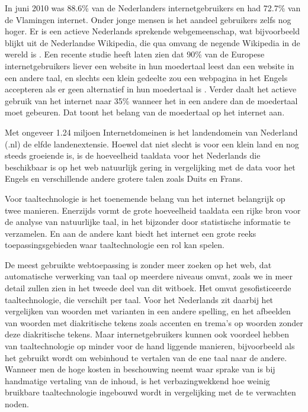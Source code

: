 \documentclass[]{../../metanetpaper}
\begin{document}
\begin{multicols}{2}
    In juni 2010 was 88.6\% van de Nederlanders  internetgebruikers \cite{Internetworldstats} en had 72.7\% van de Vlamingen \cite{VRIND} internet. Onder jonge mensen is het aandeel gebruikers zelfs nog hoger. Er is een actieve Nederlands sprekende webgemeenschap, wat bijvoorbeeld blijkt uit de Nederlandse Wikipedia, die qua omvang de negende Wikipedia in de wereld is \cite{Wikipedia}.  Een recente studie heeft laten zien dat 90\% van de Europese internetgebruikers liever een website in hun moedertaal leest dan een website in een andere taal, en slechts een klein gedeelte zou een webpagina in het Engels accepteren als er geen alternatief in hun moedertaal is \cite{Flash}. Verder daalt het actieve gebruik van het internet naar 35\% wanneer het in een andere dan de moedertaal moet gebeuren. Dat toont het belang van de moedertaal op het internet aan.


    Met ongeveer 1.24 miljoen Internetdomeinen \cite{Webstats} is het landendomein van Nederland (.nl) de elfde landenextensie. Hoewel dat niet slecht is voor een klein land en nog steeds groeiende is, is de hoeveelheid taaldata voor het Nederlands die beschikbaar is op het web natuurlijk gering in vergelijking met de data voor het Engels en verschillende andere grotere talen zoals Duits en Frans.

    Voor taaltechnologie is het toenemende belang van het internet belangrijk op twee manieren. Enerzijds vormt de grote hoeveelheid taaldata een rijke bron voor de analyse van natuurlijke taal, in het bijzonder door statistische informatie te verzamelen. En aan de andere kant biedt het internet een grote reeks toepassingsgebieden waar taaltechnologie een rol kan spelen.

    De meest gebruikte webtoepassing is zonder meer zoeken op het web, dat automatische verwerking van taal op meerdere niveaus omvat, zoals we in meer detail zullen zien in het tweede deel van dit witboek. Het omvat gesofisticeerde taaltechnologie, die verschilt per taal. Voor het Nederlands zit daarbij het vergelijken van woorden met varianten in een andere spelling, en het afbeelden van woorden met diakritische tekens zoals accenten en trema's op woorden zonder deze diakritische tekens. Maar internetgebruikers kunnen ook voordeel hebben van taaltechnologie op minder voor de hand liggende manieren, bijvoorbeeld als het gebruikt wordt om webinhoud te vertalen van de ene taal naar de andere. Wanneer men de hoge kosten in beschouwing neemt waar sprake van is bij handmatige vertaling van de inhoud, is het verbazingwekkend hoe weinig bruikbare taaltechnologie ingebouwd wordt in vergelijking met de te verwachten noden.


\end{multicols}
\end{document}

